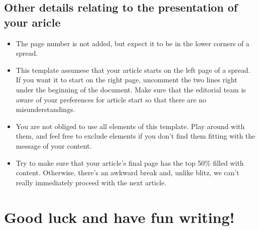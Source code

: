 \documentclass{visionen-creative}
\begin{document}
\subsection{Other details relating to the presentation of your aricle}
\begin{itemize}[leftmargin=12bp,itemsep=0bp,topsep=0bp]
  \item The page number is not added, but expect it to be in the lower corners of a spread.
  \item This template assumese that your article starts on the left page of a spread. If you want it to start on the right page, uncomment the two lines right under the beginning of the document. Make sure that the editorial team is aware of your preferences for article start so that there are no misunderstandings.
  \item You are not obliged to use all elements of this template. Play around with them, and feel free to exclude elements if you don't find them fitting with the message of your content.
  \item Try to make sure that your article's final page has the top 50\% filled with content. Otherwise, there's an awkward break and, unlike blitz, we can't really immediately proceed with the next article.
\end{itemize}

\section*{Good luck and have fun writing!}
\end{document}
